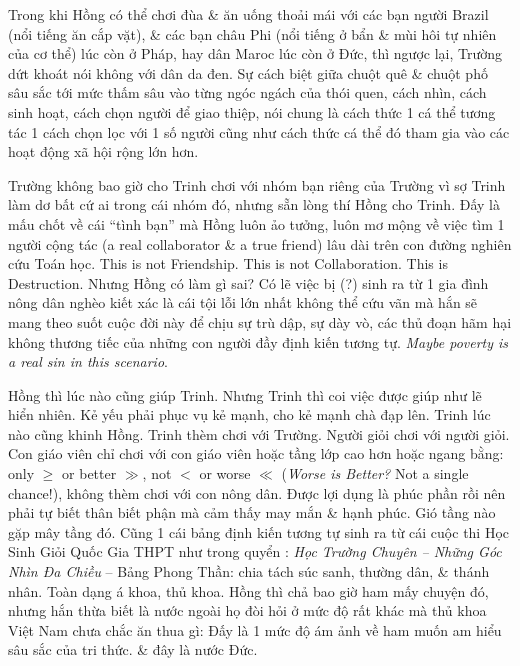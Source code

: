 \documentclass[12pt]{article}
\begin{document}
Trong khi Hồng có thể chơi đùa \& ăn uống thoải mái với các bạn người Brazil (nổi tiếng ăn cắp vặt), \& các bạn châu Phi (nổi tiếng ở bẩn \& mùi hôi tự nhiên của cơ thể) lúc còn ở Pháp, hay dân Maroc lúc còn ở Đức, thì ngược lại, Trường dứt khoát nói không với dân da đen. Sự cách biệt giữa chuột quê \& chuột phố sâu sắc tới mức thấm sâu vào từng ngóc ngách của thói quen, cách nhìn, cách sinh hoạt, cách chọn người để giao thiệp, nói chung là cách thức 1 cá thể tương tác 1 cách chọn lọc với 1 số người cũng như cách thức cá thể đó tham gia vào các hoạt động xã hội rộng lớn hơn.

Trường không bao giờ cho Trinh chơi với nhóm bạn riêng của Trường vì sợ Trinh làm dơ bất cứ ai trong cái nhóm đó, nhưng sẵn lòng thí Hồng cho Trinh. Đấy là mấu chốt về cái ``tình bạn'' mà Hồng luôn ảo tưởng, luôn mơ mộng về việc tìm 1 người cộng tác (a real collaborator \& a true friend) lâu dài trên con đường nghiên cứu Toán học. This is not Friendship. This is not Collaboration. This is Destruction. Nhưng Hồng có làm gì sai? Có lẽ việc bị (?) sinh ra từ 1 gia đình nông dân nghèo kiết xác là cái tội lỗi lớn nhất không thể cứu vãn mà hắn sẽ mang theo suốt cuộc đời này để chịu sự trù dập, sự dày vò, các thủ đoạn hãm hại không thương tiếc của những con người đầy định kiến tương tự. {\it Maybe poverty is a real sin in this scenario}.

Hồng thì lúc nào cũng giúp Trinh. Nhưng Trinh thì  coi việc được giúp như lẽ hiển nhiên. Kẻ yếu phải phục vụ kẻ mạnh, cho kẻ mạnh chà đạp lên. Trinh lúc nào cũng khinh Hồng. Trinh thèm chơi với Trường. Người giỏi chơi với người giỏi. Con giáo viên chỉ chơi với con giáo viên hoặc tầng lớp cao hơn hoặc ngang bằng: only $\ge$ or better $\gg$, not $<$ or worse $\ll$ ({\it Worse is Better?} Not a single chance!), không thèm chơi với con nông dân. Được lợi dụng là phúc phần rồi nên phải tự biết thân biết phận mà cảm thấy may mắn \& hạnh phúc. Gió tầng nào gặp mây tầng đó. Cũng 1 cái bảng định kiến tương tự sinh ra từ cái cuộc thi Học Sinh Giỏi Quốc Gia THPT như trong quyển \cite{Long2021}: {\it Học Trường Chuyên -- Những Góc Nhìn Đa Chiều} -- Bảng Phong Thần: chia tách súc sanh, thường dân, \& thánh nhân. Toàn dạng á khoa, thủ khoa. Hồng thì chả bao giờ ham mấy chuyện đó, nhưng hắn thừa biết là nước ngoài họ đòi hỏi ở mức độ rất khác mà thủ khoa Việt Nam chưa chắc ăn thua gì: Đấy là 1 mức độ ám ảnh về ham muốn am hiểu sâu sắc của tri thức. \& đây là nước Đức.
\end{document}
